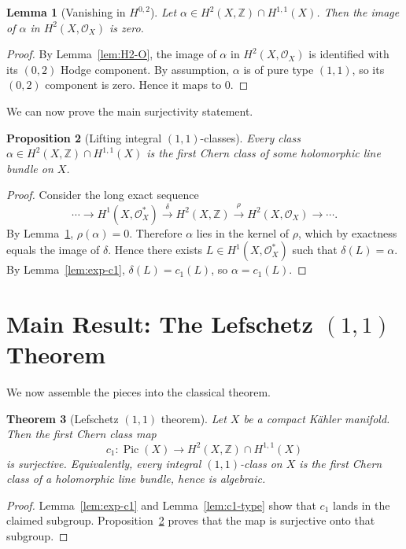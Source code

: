 \documentclass[12pt]{article}
\theoremstyle{plain}
\newtheorem{theorem}{Theorem}[section]
\newtheorem{lemma}[theorem]{Lemma}
\newtheorem{proposition}[theorem]{Proposition}
\theoremstyle{definition}
\begin{document}
\begin{lemma}[Vanishing in $H^{0,2}$]\label{lem:vanishing}
Let $\alpha \in H^2(X,\mathbb Z) \cap H^{1,1}(X)$. Then the image of $\alpha$ in $H^2(X,\mathcal O_X)$ is zero.
\end{lemma}

\begin{proof}
By Lemma~\ref{lem:H2-O}, the image of $\alpha$ in $H^2(X,\mathcal O_X)$ is identified with its $(0,2)$ Hodge component. By assumption, $\alpha$ is of pure type $(1,1)$, so its $(0,2)$ component is zero. Hence it maps to $0$.
\end{proof}

We can now prove the main surjectivity statement.

\begin{proposition}[Lifting integral $(1,1)$-classes]\label{prop:surjectivity}
Every class $\alpha \in H^2(X,\mathbb Z) \cap H^{1,1}(X)$ is the first Chern class of some holomorphic line bundle on $X$.
\end{proposition}

\begin{proof}
Consider the long exact sequence
\[
\cdots \to H^1(X,\mathcal O_X^*) \xrightarrow{\delta} H^2(X,\mathbb Z) \xrightarrow{\rho} H^2(X,\mathcal O_X) \to \cdots .
\]
By Lemma~\ref{lem:vanishing}, $\rho(\alpha) = 0$. Therefore $\alpha$ lies in the kernel of $\rho$, which by exactness equals the image of $\delta$. Hence there exists $L \in H^1(X,\mathcal O_X^*)$ such that $\delta(L) = \alpha$. By Lemma~\ref{lem:exp-c1}, $\delta(L) = c_1(L)$, so $\alpha = c_1(L)$.
\end{proof}

\section{Main Result: The Lefschetz $(1,1)$ Theorem}

We now assemble the pieces into the classical theorem.

\begin{theorem}[Lefschetz $(1,1)$ theorem]
Let $X$ be a compact K\"ahler manifold. Then the first Chern class map
\[
c_1: \operatorname{Pic}(X) \longrightarrow H^2(X,\mathbb Z) \cap H^{1,1}(X)
\]
is surjective. Equivalently, every integral $(1,1)$-class on $X$ is the first Chern class of a holomorphic line bundle, hence is algebraic.
\end{theorem}

\begin{proof}
Lemma~\ref{lem:exp-c1} and Lemma~\ref{lem:c1-type} show that $c_1$ lands in the claimed subgroup. Proposition~\ref{prop:surjectivity} proves that the map is surjective onto that subgroup.
\end{proof}
\end{document}
